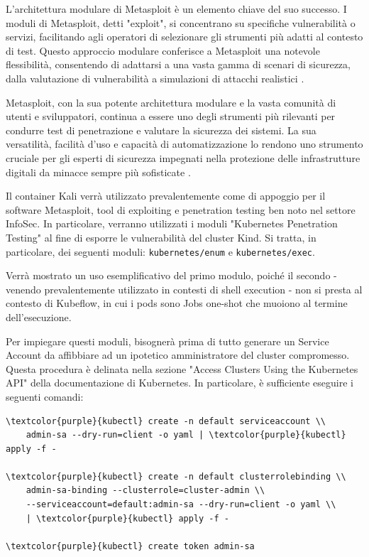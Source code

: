 L'architettura modulare di Metasploit è un elemento chiave del suo successo. I moduli di Metasploit, detti "exploit", si concentrano su specifiche vulnerabilità o servizi, facilitando agli operatori di selezionare gli strumenti più adatti al contesto di test. Questo approccio modulare conferisce a Metasploit una notevole flessibilità, consentendo di adattarsi a una vasta gamma di scenari di sicurezza, dalla valutazione di vulnerabilità a simulazioni di attacchi realistici \cite{metasploit_modularity}.

Metasploit, con la sua potente architettura modulare e la vasta comunità di utenti e sviluppatori, continua a essere uno degli strumenti più rilevanti per condurre test di penetrazione e valutare la sicurezza dei sistemi. La sua versatilità, facilità d'uso e capacità di automatizzazione lo rendono uno strumento cruciale per gli esperti di sicurezza impegnati nella protezione delle infrastrutture digitali da minacce sempre più sofisticate \cite{metasploit_future}.

Il container Kali verrà utilizzato prevalentemente come di appoggio per il software Metasploit, tool di exploiting e penetration testing ben noto nel settore InfoSec. In particolare, verranno utilizzati i moduli "Kubernetes Penetration Testing" al fine di esporre le vulnerabilità del cluster Kind. Si tratta, in particolare, dei seguenti moduli: {\small \verb|kubernetes/enum|} e {\small \verb|kubernetes/exec|}.

Verrà mostrato un uso esemplificativo del primo modulo, poiché il secondo - venendo prevalentemente utilizzato in contesti di shell execution - non si presta al contesto di Kubeflow, in cui i pods sono Jobs one-shot che muoiono al termine dell'esecuzione.

Per impiegare questi moduli, bisognerà prima di tutto generare un Service Account da affibbiare ad un ipotetico amministratore del cluster compromesso. Questa procedura è delinata nella sezione "Access Clusters Using the Kubernetes API" \cite{k8s-docs-access} della documentazione di Kubernetes. In particolare, è sufficiente eseguire i seguenti comandi:

\begin{small}
\begin{Verbatim}[commandchars=\\\{\}]
\textcolor{purple}{kubectl} create -n default serviceaccount \\
    admin-sa --dry-run=client -o yaml | \textcolor{purple}{kubectl} apply -f -

\textcolor{purple}{kubectl} create -n default clusterrolebinding \\
    admin-sa-binding --clusterrole=cluster-admin \\
    --serviceaccount=default:admin-sa --dry-run=client -o yaml \\
    | \textcolor{purple}{kubectl} apply -f -

\textcolor{purple}{kubectl} create token admin-sa
\end{Verbatim}
\end{small}

